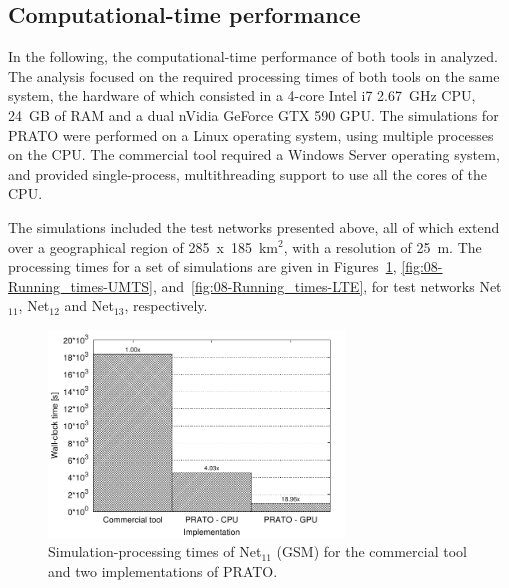 \subsection*{Computational-time performance}

In the following, the computational-time performance of both tools
in analyzed. The analysis focused on the required processing times
of both tools on the same system, the hardware of which consisted
in a 4-core Intel i7 2.67~GHz CPU, 24~GB of RAM and a dual nVidia
GeForce GTX 590 GPU. The simulations for PRATO were performed on a
Linux operating system, using multiple processes on the CPU. The commercial
tool required a Windows Server operating system, and provided single-process,
multithreading support to use all the cores of the CPU.

The simulations included the test networks presented above, all of
which extend over a geographical region of 285~x~185~km$^{2}$,
with a resolution of 25~m. The processing times for a set of simulations
are given in Figures~\ref{fig:08-Running_times-GSM}, \ref{fig:08-Running_times-UMTS},
and~\ref{fig:08-Running_times-LTE}, for test networks Net$_{11}$,
Net$_{12}$ and Net$_{13}$, respectively.

\begin{figure}[h]
\centering

\includegraphics[width=0.7\textwidth]{08-real_network_planning/img/gsm_running_times}

\caption{Simulation-processing times of Net$_{11}$ (GSM) for the commercial
tool and two implementations of PRATO. \label{fig:08-Running_times-GSM}}
\end{figure}


